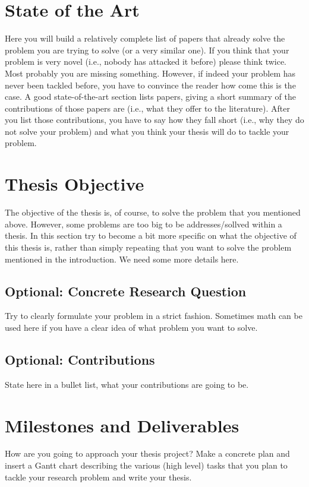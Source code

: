 \documentclass[a4paper]{article}
\begin{document}


\section{State of the Art}
Here you will build a relatively complete list of papers that already solve the problem you are trying to solve (or a very similar one). If you think that your problem is very novel (i.e., nobody has attacked it before) please think twice. Most probably you are missing something. However, if indeed your problem has never been tackled before, you have to convince the reader how come this is the case. A good state-of-the-art section lists papers, giving a short summary of the contributions of those papers are (i.e., what they offer to the literature). After you list those contributions, you have to say how they fall short (i.e., why they do not solve your problem) and what you think your thesis will do to tackle your problem.


\section{Thesis Objective}
The objective of the thesis is, of course, to solve the problem that you mentioned above. However, some problems are too big to be addresses/sollved within a thesis. In this section try to become a bit more specific on what the objective of this thesis is, rather than simply repeating that you want to solve the problem mentioned in the introduction. We need some more details here.

\subsection{Optional: Concrete Research Question}
Try to clearly formulate your problem in a strict fashion. Sometimes math can be used here if you have a clear idea of what problem you want to solve. 

\subsection{Optional: Contributions}
State here in a bullet list, what your contributions are going to be. 

\section{Milestones and Deliverables}
How are you going to approach your thesis project? Make a concrete plan and insert a Gantt chart describing the various (high level) tasks that you plan to tackle your research problem and write your thesis. 

\end{document}
